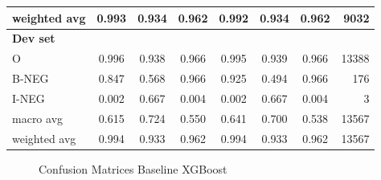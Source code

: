\begin{table}[!ht]
\begin{tabular}{lccc|cccr}
weighted avg       &  0.993 &  0.934 &  0.962 & 0.992 & 0.934 & 0.962 & 9032 \\
\hline
\textbf{Dev set}   &        &        &        &       &       & &   \\
O                  &  0.996 &  0.938 &  0.966 & 0.995 & 0.939 & 0.966 & 13388 \\
B-NEG              &  0.847 &  0.568 &  0.966 & 0.925 & 0.494 & 0.966 & 176 \\
I-NEG              &  0.002 &  0.667 &  0.004 & 0.002 & 0.667 & 0.004 & 3 \\
macro avg          &  0.615 &  0.724 &  0.550 & 0.641 & 0.700 & 0.538 & 13567 \\
weighted avg       &  0.994 &  0.933 &  0.962 & 0.994 & 0.933 & 0.962 & 13567 \\
\hline
\end{tabular}
\end{table}




\begin{figure}[!h]
\centering
  \caption{Confusion Matrices Baseline XGBoost}
  \label{fig:base_line_xgb}
\end{figure}


\FloatBarrier




